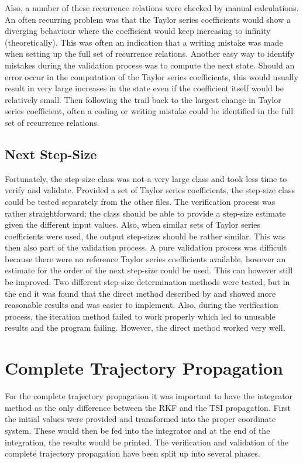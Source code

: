 Also, a number of these recurrence relations were checked by manual calculations. An often recurring problem was that the Taylor series coefficients would show a diverging behaviour where the coefficient would keep increasing to infinity (theoretically). This was often an indication that a writing mistake was made when setting up the full set of recurrence relations. Another easy way to identify mistakes during the validation process was to compute the next state. Should an error occur in the computation of the Taylor series coefficients, this would usually result in very large increases in the state even if the coefficient itself would be relatively small. Then following the trail back to the largest change in Taylor series coefficient, often a coding or writing mistake could be identified in the full set of recurrence relations. 

\subsection{Next Step-Size}
\label{subsec:nextStepSizeverval}
Fortunately, the step-size class was not a very large class and took less time to verify and validate. Provided a set of Taylor series coefficients, the step-size class could be tested separately from the other files. The verification process was rather straightforward; the class should be able to provide a step-size estimate given the different input values. Also, when similar sets of Taylor series coefficients were used, the output step-sizes should be rather similar. This was then also part of the validation process. A pure validation process was difficult because there were no reference Taylor series coefficients available, however an estimate for the order of the next step-size could be used. This can however still be improved. Two different step-size determination methods were tested, but in the end it was found that the direct method described by \cite{scott2008high} and \cite{bergsma2015application} showed more reasonable results and was easier to implement. Also, during the verification process, the iteration method failed to work properly which led to unusable results and the program failing. However, the direct method worked very well.




\section{Complete Trajectory Propagation}
\label{sec:propverval}
For the complete trajectory propagation it was important to have the integrator method as the only difference between the \ac{RKF} and the \ac{TSI} propagation. First the initial values were provided and transformed into the proper coordinate system. These would then be fed into the integrator and at the end of the integration, the results would be printed. The verification and validation of the complete trajectory propagation have been split up into several phases.


